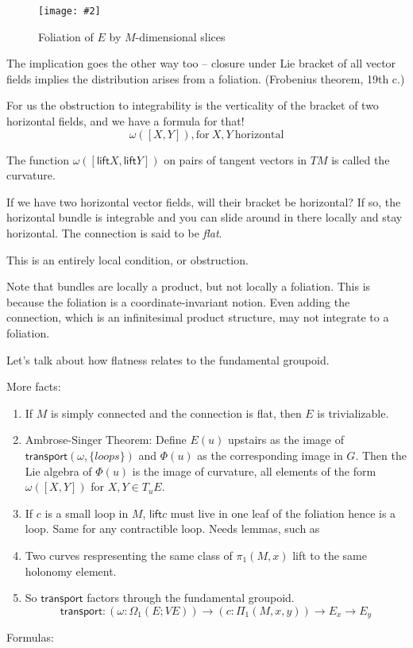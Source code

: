 \documentclass[12pt]{article}
\newcommand{\lift}{\ensuremath{\textsf{lift}}}
\newcommand{\transport}{\ensuremath{\textsf{transport}}}
\newcommand{\myfig}[2]{\begin{figure}[h]\caption{#1}\centering\texttt{[image: \#2]}\end{figure}}
\begin{document}
\myfig{Foliation of $E$ by $M$-dimensional slices}{foliation}

The implication goes the other way too -- closure under Lie bracket of all vector fields implies the distribution arises from a foliation. (Frobenius theorem, 19th c.)

For us the obstruction to integrability is the verticality of the bracket of two horizontal fields, and we have a formula for that! $$\omega([X, Y]), \mathrm{for\ }X, Y\mathrm{\ horizontal}$$

The function $\omega([\lift X, \lift Y])$ on pairs of tangent vectors in $TM$ is called the curvature.

If we have two horizontal vector fields, will their bracket be horizontal? If so, the horizontal bundle is integrable and you can slide around in there locally and stay horizontal. The connection is said to be \emph{flat}.

This is an entirely local condition, or obstruction.

Note that bundles are locally a product, but not locally a foliation. This is because the foliation is a coordinate-invariant notion. Even adding the connection, which is an infinitesimal product structure, may not integrate to a foliation.

Let's talk about how flatness relates to the fundamental groupoid.

More facts:
\begin{enumerate}
\item If $M$ is simply connected and the connection is flat, then $E$ is trivializable.
\item Ambrose-Singer Theorem: Define $E(u)$ upstairs as the image of $\transport(\omega, \{loops\})$ and $\Phi(u)$ as the corresponding image in $G$. Then the Lie algebra of $\Phi(u)$ is the image of curvature, all elements of the form $\omega([X, Y])$ for $X, Y\in T_uE$.
\item If $c$ is a small loop in $M$, $\lift c$ must live in one leaf of the foliation hence is a loop. Same for any contractible loop. Needs lemmas, such as 
\item Two curves respresenting the same class of $\pi_1(M, x)$ lift to the same holonomy element.
\item So $\transport$ factors through the fundamental groupoid. $$\transport: (\omega : \Omega_1(E; VE))\to (c: \Pi_1(M, x, y)) \to E_{x} \to E_{y}$$
\end{enumerate}


Formulas:
\end{document}
